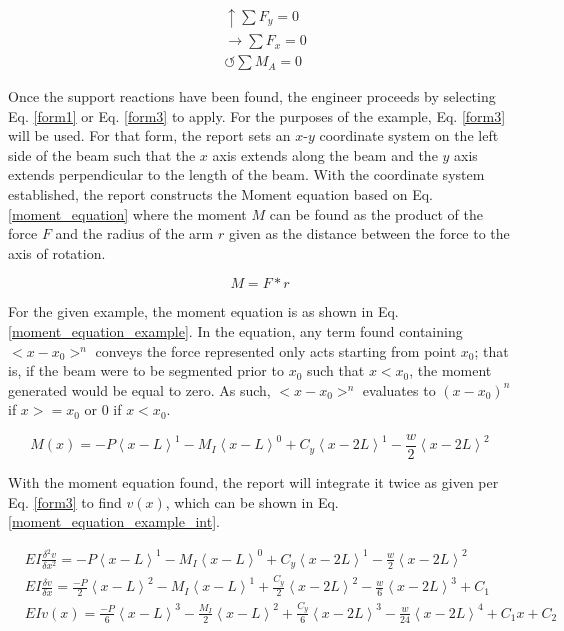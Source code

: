 \documentclass[a4paper]{article}
\begin{document}
\begin{equation}
    \begin{split}
    &\uparrow \sum F_y = 0 \\
    &\rightarrow \sum F_x = 0 \\
    &\circlearrowleft \sum M_A = 0
    \end{split}
\label{static_equations}
\end{equation}

Once the support reactions have been found, the engineer proceeds by selecting Eq. \ref{form1} or Eq. \ref{form3} to apply. For the purposes of the example, Eq. \ref{form3} will be used. For that form, the report sets an $x$-$y$ coordinate system on the left side of the beam such that the $x$ axis extends along the beam and the $y$ axis extends perpendicular to the length of the beam. With the coordinate system established, the report constructs the Moment equation based on Eq. \ref{moment_equation} where the moment $M$ can be found as the product of the force $F$ and the radius of the arm $r$ given as the distance between the force to the axis of rotation.

\begin{equation}
    M = F * r
\label{moment_equation}
\end{equation}

For the given example, the moment equation is as shown in Eq. \ref{moment_equation_example}. In the equation, any term found containing $<x-x_0>^n$ conveys the force represented only acts starting from point $x_0$; that is, if the beam were to be segmented prior to $x_0$ such that $x<x_0$, the moment generated would be equal to zero. As such, $<x-x_0>^n$ evaluates to $(x-x_0)^n$ if $x>=x_0$ or $0$ if $x<x_0$.

\begin{equation}
    M(x) = -P\left<x-L\right>^1 - M_I\left<x-L\right>^0 + C_y\left<x-2L\right>^1 - \frac{w}{2}\left<x-2L\right>^2
\label{moment_equation_example}
\end{equation}

With the moment equation found, the report will integrate it twice as given per Eq. \ref{form3} to find $v(x)$, which can be shown in Eq. \ref{moment_equation_example_int}.

\begin{equation}
    \begin{split}
    & EI \frac{\delta^2 v}{\delta x^2} = -P\left<x-L\right>^1 - M_I\left<x-L\right>^0 + C_y\left<x-2L\right>^1 - \frac{w}{2}\left<x-2L\right>^2 \\
    & EI \frac{\delta v}{\delta x} = \frac{-P}{2}\left<x-L\right>^2 - M_I\left<x-L\right>^1 + \frac{C_y}{2}\left<x-2L\right>^2 -  \frac{w}{6}\left<x-2L\right>^3 + C_1\\
    & EI v(x) = \frac{-P}{6}\left<x-L\right>^3 - \frac{M_I}{2}\left<x-L\right>^2 + \frac{C_y}{6}\left<x-2L\right>^3 - \frac{w}{24}\left<x-2L\right>^4 + C_1 x + C_2
    \end{split}
\label{moment_equation_example_int}
\end{equation}
\end{document}
